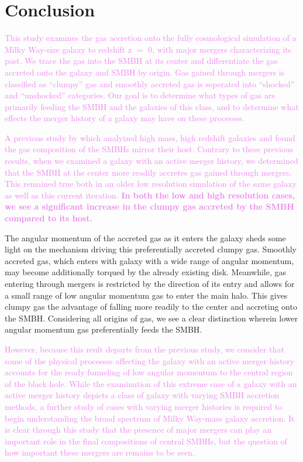 \documentclass[manuscript]{aastex}
\begin{document}



\section{Conclusion}
\textcolor{violet}{
This study examines the gas accretion onto the fully cosmological simulation of a Milky Way-size galaxy to redshift z $=$ 0, with major mergers characterizing its past. We trace the gas into the SMBH at its center and differentiate the gas accreted onto the galaxy and SMBH by origin. Gas gained through mergers is classified as ``clumpy'' gas and smoothly accreted gas is seperated into ``shocked'' and ``unshocked'' categories. Our goal is to determine what types of gas are primarily feeding the SMBH and the galaxies of this class, and to determine what effects the merger history of a galaxy may have on these processes.
}

\textcolor{violet}{
A previous study by \cite{Bellovary2013} which analyized high mass, high redshift galaxies and found the gas composition of the SMBHs mirror their host. Contrary to these previous results, when we examined a galaxy with an active merger history, we determined that the SMBH at the center more readily accretes gas gained through mergers. This remained true both in an older low resolution simulation of the same galaxy as well as this current iteration. \textbf{In both the low and high resolution cases, we see a significant increase in the clumpy gas accreted by the SMBH compared to its host.} 
}

The angular momentum of the accreted gas as it enters the galaxy sheds some light on the mechanism driving this preferentially accreted clumpy gas. Smoothly accreted gas, which enters with galaxy with a wide range of angular momentum, may become additionally torqued by the already existing disk. Meanwhile, gas entering through mergers is restricted by the direction of its entry and allows for a small range of low angular momentum gas to enter the main halo. This gives clumpy gas the advantage of falling more readily to the center and accreting onto the SMBH. Considering all origins of gas, we see a clear distinction wherein lower angular momentum gas preferentially feeds the SMBH.

\textcolor{violet}{
However, because this reult departs from the previous study, we consider that some of the physical processes affecting the galaxy with an active merger history accounts for the ready funneling of low angular momentum to the central region of the black hole. 
}
\textcolor{violet}{
While the examination of this extreme case of a galaxy with an active merger history depicts a class of galaxy with varying SMBH accretion methods, a further study of cases with varying merger histories is required to begin understanding the broad spectrum of Milky Way-mass galaxy accretion. It is clear through this study that the presence of major mergers can play an important role in the final compositions of central SMBHs, but the question of how important these mergers are remains to be seen.
}
\end{document}
